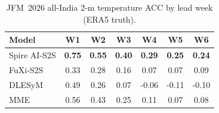 \begin{table}[t]
  \centering
  \caption{JFM~2026 all-India 2-m temperature ACC by lead week (ERA5 truth).}
  \label{tab:jfm_acc_t2m}
  \small
  \begin{tabular}{lcccccc}
    \toprule
    Model & W1 & W2 & W3 & W4 & W5 & W6 \\
    \midrule
    Spire AI-S2S   & \textbf{0.75} & \textbf{0.55} & \textbf{0.40} & \textbf{0.29} & \textbf{0.25} & \textbf{0.24} \\
FuXi-S2S       & 0.33 & 0.28 & 0.16 & 0.07 & 0.07 & 0.09 \\
DLESyM         & 0.49 & 0.26 & 0.07 & -0.06 & -0.11 & -0.10 \\
MME            & 0.56 & 0.43 & 0.25 & 0.11 & 0.07 & 0.08 \\
    \bottomrule
  \end{tabular}
\end{table}
